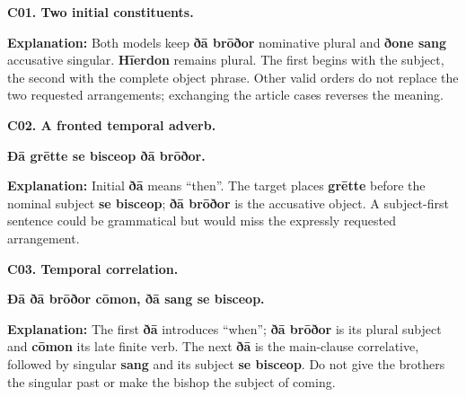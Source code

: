 \par\begin{minipage}{\linewidth}\raggedright
\textbf{C01. Two initial constituents.}



\textbf{Explanation:} Both models keep \textbf{ðā brōðor} nominative plural and \textbf{ðone sang} accusative singular. \textbf{Hīerdon} remains plural. The first begins with the subject, the second with the complete object phrase. Other valid orders do not replace the two requested arrangements; exchanging the article cases reverses the meaning.

\end{minipage}\par\addvspace{4pt}

\par\begin{minipage}{\linewidth}\raggedright
\textbf{C02. A fronted temporal adverb.}

\textbf{Ðā grētte se bisceop ðā brōðor.}

\textbf{Explanation:} Initial \textbf{ðā} means “then”. The target places \textbf{grētte} before the nominal subject \textbf{se bisceop}; \textbf{ðā brōðor} is the accusative object. A subject-first sentence could be grammatical but would miss the expressly requested arrangement.

\end{minipage}\par\addvspace{4pt}

\par\begin{minipage}{\linewidth}\raggedright
\textbf{C03. Temporal correlation.}

\textbf{Ðā ðā brōðor cōmon, ðā sang se bisceop.}

\textbf{Explanation:} The first \textbf{ðā} introduces “when”; \textbf{ðā brōðor} is its plural subject and \textbf{cōmon} its late finite verb. The next \textbf{ðā} is the main-clause correlative, followed by singular \textbf{sang} and its subject \textbf{se bisceop}. Do not give the brothers the singular past or make the bishop the subject of coming.

\end{minipage}\par\addvspace{4pt}

